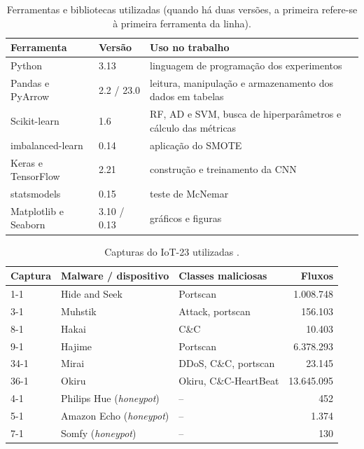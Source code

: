 \documentclass[alpha-refs,brazilian]{CC-EC_TF-TC}
\begin{document}
\begin{table}[htbp]
\centering
\caption{Ferramentas e bibliotecas utilizadas (quando há duas versões, a primeira refere-se à primeira ferramenta da linha).}
\label{tab:ferramentas}
\small
\setlength{\tabcolsep}{3pt}
\begin{tabular}{>{\raggedright\arraybackslash}p{}l>{\raggedright\arraybackslash}p{}}
\toprule
\textbf{Ferramenta} & \textbf{Versão} & \textbf{Uso no trabalho} \\
\midrule
Python & 3.13 & linguagem de programação dos experimentos \\
Pandas e PyArrow & 2.2 / 23.0 & leitura, manipulação e armazenamento dos dados em tabelas \\
Scikit-learn \citep{pedregosa2011scikit} & 1.6 & RF, AD e SVM, busca de hiperparâmetros e cálculo das métricas \\
imbalanced-learn \citep{lemaitre2017imbalanced} & 0.14 & aplicação do SMOTE \\
Keras e TensorFlow \citep{abadi2016tensorflow} & 2.21 & construção e treinamento da CNN \\
statsmodels \citep{seabold2010statsmodels} & 0.15 & teste de McNemar \\
Matplotlib e Seaborn & 3.10 / 0.13 & gráficos e figuras \\
\bottomrule
\end{tabular}
\end{table}

\begin{table}[htbp]
\centering
\caption{Capturas do IoT-23 utilizadas \citep{garcia2020iot23}.}
\label{tab:cenarios}
\small
\setlength{\tabcolsep}{4pt}
\begin{tabular}{l>{\raggedright\arraybackslash}p{}>{\raggedright\arraybackslash}p{}r}
\toprule
\textbf{Captura} & \textbf{Malware / dispositivo} & \textbf{Classes maliciosas} & \textbf{Fluxos} \\
\midrule
1-1  & Hide and Seek & Portscan               &  1.008.748 \\
3-1  & Muhstik       & Attack, portscan       &    156.103 \\
8-1  & Hakai         & C\&C                   &     10.403 \\
9-1  & Hajime        & Portscan               &  6.378.293 \\
34-1 & Mirai         & DDoS, C\&C, portscan   &     23.145 \\
36-1 & Okiru         & Okiru, C\&C-HeartBeat  & 13.645.095 \\
\midrule
4-1  & Philips Hue (\textit{honeypot})  & -- & 452 \\
5-1  & Amazon Echo (\textit{honeypot})  & -- & 1.374 \\
7-1  & Somfy (\textit{honeypot})        & -- & 130 \\
\bottomrule
\end{tabular}
\end{table}
\end{document}
